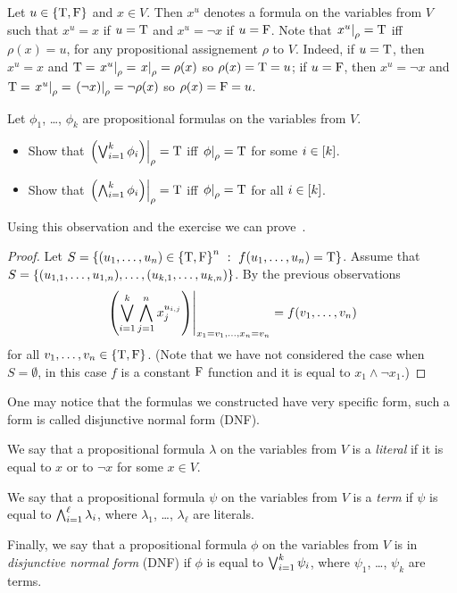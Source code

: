 Let $u \in \set{\ltrue, \lfalse}$ and $x \in V$. Then $x^u$ denotes a
formula on the variables from $V$ such that $x^u = x$ if $u = \text{T}$ and
$x^u = \lnot x$ if $u = \text{F}$. Note that $\left. {x^u} \right\rvert_{\rho} = \text{T}$
iff $\rho(x) = u$, for any propositional assignement $\rho$ to $V$.
Indeed, if $u = \text{T}$, then $x^u = x$ and
$\text{T} = \left. {x^u} \right\rvert_{\rho} = \left. {x} \right\rvert_{\rho} = \rho(x)$ so
$\rho(x) = \text{T} = u$;
if $u = \text{F}$, then $x^u = \lnot x$ and
$\text{T} = \left. {x^u} \right\rvert_{\rho} = \left. {\left(\lnot x\right)} \right\rvert_{\rho} =
\lnot \rho(x)$ so $\rho(x) = \text{F} = u$.

\begin{exercise}
  Let $\phi_1$, \dots, $\phi_k$ are propositional formulas
  on the variables from $V$.
  \begin{itemize}
    \item Show that
      $\left. {\left(\bigvee_{i = 1}^k \phi_i\right)} \right\rvert_{\rho} = \text{T}$ iff
      $\left. {\phi} \right\rvert_{\rho} = \text{T}$ for some $i \in [{k}]$.
    \item Show that
      $\left. {\left(\bigwedge_{i = 1}^k \phi_i\right)} \right\rvert_{\rho} = \text{T}$ iff
      $\left. {\phi} \right\rvert_{\rho} = \text{T}$ for all $i \in [{k}]$.
  \end{itemize}
\end{exercise}

Using this observation and the exercise we can
prove~.
\begin{proof}
  Let $S = \set[f(u_1, \dots, u_n) = \ltrue]{(u_1, \dots, u_n) \in
    \set{\ltrue, \lfalse}^n}$.
  Assume that
  $S = \set{(u_{1, 1}, \dots, u_{1, n}), \dots, (u_{k, 1}, \dots, u_{k, n})}$.
  By the previous observations
  \[
    \left. {
      \left(
        \bigvee_{i = 1}^k
          \bigwedge_{j = 1}^n x_j^{u_{i, j}}
      \right)
    } \right\rvert_{x_1 = v_1, \dots, x_n = v_n}
    =
    f(v_1, \dots, v_n)
  \]
  for all $v_1, \dots, v_n \in \set{\ltrue, \lfalse}$.
  (Note that we have not considered the case when $S = \emptyset$, in this
  case $f$ is a constant $\text{F}$ function and it is equal to
  $x_1 \land \lnot x_1$.)
\end{proof}

One may notice that the formulas we constructed have very specific form,
such a form is called disjunctive normal form (DNF).
\begin{definition}
  We say that a propositional formula $\lambda$ on the variables from $V$
  is a \emph{literal} if it is equal to $x$ or to $\lnot x$ for some
  $x \in V$.

  We say that a propositional formula $\psi$ on the variables from $V$ is
  a \emph{term} if $\psi$ is equal to $\bigwedge_{i = 1}^\ell \lambda_i$, where $\lambda_1$, \dots, $\lambda_\ell$ are literals.

  Finally, we say that a propositional formula $\phi$ on the variables from
  $V$ is in \emph{disjunctive normal form} (DNF) if $\phi$ is equal to
  $\bigvee_{i = 1}^k \psi_i$, where $\psi_1$, \dots, $\psi_k$ are
  terms.
\end{definition}

